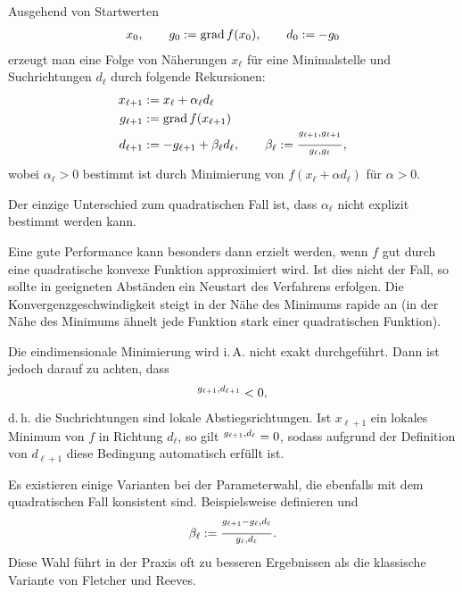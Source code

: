 Ausgehend von Startwerten
\begin{align*}
    x_0, \qquad
    g_0 := \operatorname{grad} f(x_0), \qquad
    d_0 := -g_0
\end{align*}
erzeugt man eine Folge von Näherungen $x_\ell$ für eine Minimalstelle und
Suchrichtungen $d_\ell$ durch folgende Rekursionen:
\begin{align*}
    x_{\ell+1} & := x_\ell + \alpha_\ell d_\ell \\
    g_{\ell+1} & := \operatorname{grad} f(x_{\ell+1}) \\
    d_{\ell+1} & := -g_{\ell+1} + \beta_\ell d_\ell, \qquad
    \beta_\ell := \frac{\sp{g_{\ell+1}, g_{\ell+1}}}{\sp{g_\ell, g_\ell}},
\end{align*}
wobei $\alpha_\ell > 0$ bestimmt ist durch Minimierung von
$f(x_\ell + \alpha d_\ell)$ für $\alpha > 0$.

Der einzige Unterschied zum quadratischen Fall ist, dass $\alpha_\ell$ nicht
explizit bestimmt werden kann.

\linie

Eine gute Performance kann besonders dann erzielt werden, wenn $f$ gut durch
eine quadratische konvexe Funktion approximiert wird.
Ist dies nicht der Fall, so sollte in geeigneten Abständen ein Neustart
des Verfahrens erfolgen.
Die Konvergenzgeschwindigkeit steigt in der Nähe des Minimums rapide an
(in der Nähe des Minimums ähnelt jede Funktion stark einer quadratischen
Funktion).

\linie

Die eindimensionale Minimierung wird i.\,A. nicht exakt durchgeführt.
Dann ist jedoch darauf zu achten, dass
\begin{align*}
    \sp{g_{\ell+1}, d_{\ell+1}} < 0,
\end{align*}
d.\,h. die Suchrichtungen sind lokale Abstiegsrichtungen.
Ist $x_{\ell+1}$ ein lokales Minimum von $f$ in Richtung $d_\ell$, so gilt
$\sp{g_{\ell+1}, d_\ell} = 0$, sodass aufgrund der Definition von
$d_{\ell+1}$ diese Bedingung automatisch erfüllt ist.

\linie

Es existieren einige Varianten bei der Parameterwahl, die ebenfalls mit dem
quadratischen Fall konsistent sind.
Beispielsweise definieren  und 
\begin{align*}
    \beta_\ell := \frac{\sp{g_{\ell+1} - g_\ell, d_\ell}}{\sp{g_\ell, d_\ell}}.
\end{align*}
Diese Wahl führt in der Praxis oft zu besseren Ergebnissen als die klassische
Variante von Fletcher und Reeves.

